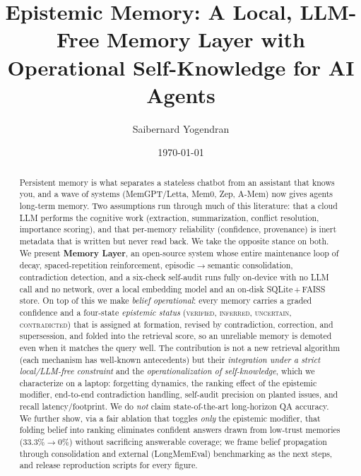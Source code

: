 \documentclass[11pt]{article}
\title{\textbf{Epistemic Memory: A Local, LLM-Free Memory Layer with\\
Operational Self-Knowledge for AI Agents}}
\author[ ]{Saibernard Yogendran}
\affil[ ]{Independent Researcher\\ \texttt{saibernard97@gmail.com}}
\date{\today}
\theoremstyle{definition}
\newcommand{\status}[1]{\textsc{#1}}
\begin{document}
\maketitle

\begin{abstract}
\noindent
Persistent memory is what separates a stateless chatbot from an assistant that
knows you, and a wave of systems (MemGPT/Letta, Mem0, Zep, A-Mem) now gives
agents long-term memory. Two assumptions run through much of this literature: that a
cloud LLM performs the cognitive work (extraction, summarization, conflict
resolution, importance scoring), and that per-memory reliability (confidence,
provenance) is inert metadata that is written but never read back. We take the
opposite stance on both. We present \textbf{Memory Layer}, an open-source system
whose entire maintenance loop of decay, spaced-repetition reinforcement,
episodic$\to$semantic consolidation, contradiction detection, and a six-check
self-audit runs fully on-device with no LLM call and no network, over a local
embedding model and an on-disk SQLite\,+\,FAISS store. On top of this we make
\emph{belief operational}: every memory carries a graded confidence and a
four-state \emph{epistemic status} (\status{verified}, \status{inferred},
\status{uncertain}, \status{contradicted}) that is assigned at formation, revised
by contradiction, correction, and supersession, and folded into
the retrieval score, so an unreliable memory is demoted even when it matches the
query well. The contribution is not a new retrieval algorithm (each mechanism
has well-known antecedents) but their \emph{integration under a strict
local/LLM-free constraint} and the \emph{operationalization of self-knowledge},
which we characterize on a laptop: forgetting dynamics, the ranking effect of the
epistemic modifier, end-to-end contradiction handling, self-audit precision on
planted issues, and recall latency/footprint. We do \emph{not} claim
state-of-the-art long-horizon QA accuracy. We further show, via a fair ablation
that toggles \emph{only} the epistemic modifier, that folding belief into ranking
eliminates confident answers drawn from low-trust memories
($33.3\%\!\rightarrow\!0\%$) without sacrificing answerable coverage; we frame
belief propagation through consolidation and external (LongMemEval) benchmarking
as the next steps, and release reproduction scripts for every figure.
\end{abstract}

\end{document}
